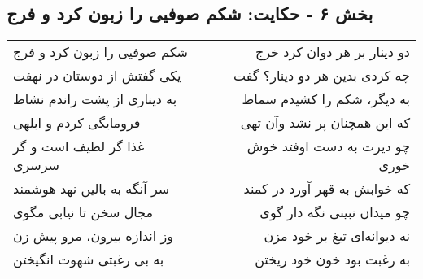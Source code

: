 \begin{center}
\section*{بخش ۶ - حکایت: شکم صوفیی را زبون کرد و فرج}
\label{sec:006}
\begin{longtable}{l p{0.5cm} r}
شکم صوفیی را زبون کرد و فرج
&&
دو دینار بر هر دوان کرد خرج
\\
یکی گفتش از دوستان در نهفت
&&
چه کردی بدین هر دو دینار؟ گفت
\\
به دیناری از پشت راندم نشاط
&&
به دیگر، شکم را کشیدم سماط
\\
فرومایگی کردم و ابلهی
&&
که این همچنان پر نشد وآن تهی
\\
غذا گر لطیف است و گر سرسری
&&
چو دیرت به دست اوفتد خوش خوری
\\
سر آنگه به بالین نهد هوشمند
&&
که خوابش به قهر آورد در کمند
\\
مجال سخن تا نیابی مگوی
&&
چو میدان نبینی نگه دار گوی
\\
وز اندازه بیرون، مرو پیش زن
&&
نه دیوانه‌ای تیغ بر خود مزن
\\
به بی رغبتی شهوت انگیختن
&&
به رغبت بود خون خود ریختن
\\
\end{longtable}
\end{center}
